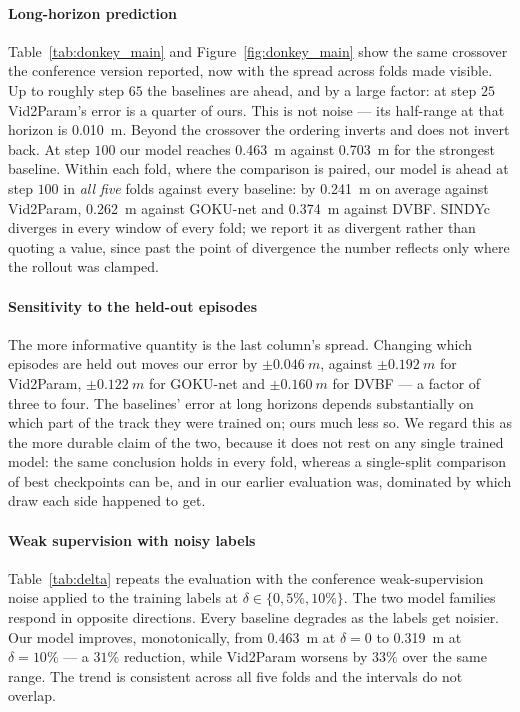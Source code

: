 \paragraph{Long-horizon prediction}
Table~\ref{tab:donkey_main} and Figure~\ref{fig:donkey_main} show the same
crossover the conference version reported, now with the spread across folds made
visible. Up to roughly step $65$ the baselines are ahead, and by a large factor:
at step $25$ Vid2Param's error is a quarter of ours. This is not noise --- its
half-range at that horizon is \SI{0.010}{m}. Beyond the crossover the ordering
inverts and does not invert back. At step $100$ our model reaches
\SI{0.463}{m} against \SI{0.703}{m} for the strongest baseline. Within each
fold, where the comparison is paired, our model is ahead at step $100$ in
\emph{all five} folds against every baseline: by \SI{0.241}{m} on average
against Vid2Param, \SI{0.262}{m} against GOKU-net and \SI{0.374}{m} against
DVBF. SINDYc diverges in every window of every fold; we report it as divergent
rather than quoting a value, since past the point of divergence the number
reflects only where the rollout was clamped.

\paragraph{Sensitivity to the held-out episodes}
The more informative quantity is the last column's spread. Changing which
episodes are held out moves our error by $\pm\SI{0.046}{m}$, against
$\pm\SI{0.192}{m}$ for Vid2Param, $\pm\SI{0.122}{m}$ for GOKU-net and
$\pm\SI{0.160}{m}$ for DVBF --- a factor of three to four. The baselines' error
at long horizons depends substantially on which part of the track they were
trained on; ours much less so. We regard this as the more durable claim of the
two, because it does not rest on any single trained model: the same conclusion
holds in every fold, whereas a single-split comparison of best checkpoints can
be, and in our earlier evaluation was, dominated by which draw each side
happened to get.

\paragraph{Weak supervision with noisy labels}
Table~\ref{tab:delta} repeats the evaluation with the conference weak-supervision
noise applied to the training labels at $\delta \in \{0, 5\%, 10\%\}$. The two
model families respond in opposite directions. Every baseline degrades as the
labels get noisier. Our model improves, monotonically, from \SI{0.463}{m} at
$\delta = 0$ to \SI{0.319}{m} at $\delta = 10\%$ --- a $31\%$ reduction, while
Vid2Param worsens by $33\%$ over the same range. The trend is consistent across
all five folds and the intervals do not overlap.

